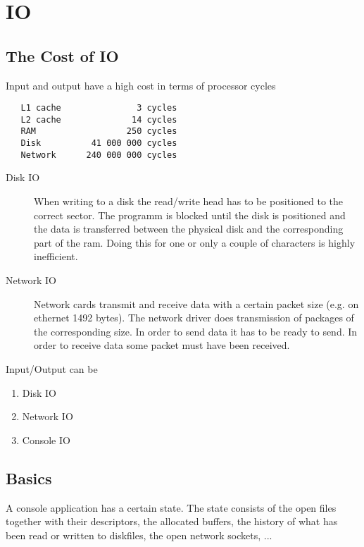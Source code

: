 \chapter{IO}

\section{The Cost of IO}

Input and output have a high cost in terms of processor cycles
{\small
\begin{verbatim}
   L1 cache               3 cycles
   L2 cache              14 cycles
   RAM                  250 cycles
   Disk          41 000 000 cycles
   Network      240 000 000 cycles
\end{verbatim}
}
%
\begin{description}

\item[Disk IO] When writing to a disk the read/write head has to be positioned
  to the correct sector. The programm is blocked until the disk is positioned
  and the data is transferred between the physical disk and the corresponding
  part of the ram. Doing this for one or only a couple of characters is highly
  inefficient.

\item[Network IO] Network cards transmit and receive data with a certain
  packet size (e.g. on ethernet 1492 bytes). The network driver does
  transmission of packages of the corresponding size. In order to send data it
  has to be ready to send. In order to receive data some packet must have been
  received.
\end{description}



Input/Output can be
\begin{enumerate}
\item Disk IO

\item Network IO

\item Console IO
\end{enumerate}




\section{Basics}

A console application has a certain state. The state consists of the open
files together with their descriptors, the allocated buffers, the history of
what has been read or written to diskfiles, the open network sockets, ...

